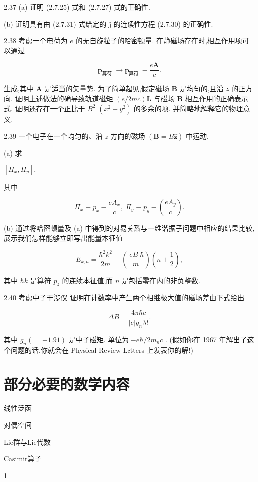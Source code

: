 \documentclass[lang=cn,newtx,10pt,scheme=chinese,thmcnt=section]{elegantbook}
\begin{document}
2.37 (a) 证明 (2.7.25) 式和 (2.7.27) 式的正确性.

(b) 证明具有由 (2.7.31) 式给定的 $\mathbf{j}$ 的连续性方程 (2.7.30) 的正确性.

2.38 考虑一个电荷为 $e$ 的无自旋粒子的哈密顿量. 在静磁场存在时,相互作用项可以通过

$$
{\mathbf{p}}_{\text{算符 }} \rightarrow {\mathbf{p}}_{\text{算符 }} - \frac{e\mathbf{A}}{c}.
$$

生成,其中 $\mathbf{A}$ 是适当的矢量势. 为了简单起见,假定磁场 $\mathbf{B}$ 是均匀的,且沿 $z$ 的正方向. 证明上述做法的确导致轨道磁矩 $\left( {e/{2mc}}\right) \mathbf{L}$ 与磁场 $\mathbf{B}$ 相互作用的正确表示式. 证明还存在一个正比于 ${B}^{2}$ $\left( {{x}^{2} + {y}^{2}}\right)$ 的多余的项. 并简略地解释它的物理意义.

2.39 一个电子在一个均匀的、沿 $z$ 方向的磁场 $\left( {\mathbf{B} = B\widehat{\mathbf{z}}}\right)$ 中运动.

(a) 求

$\left\lbrack {{\Pi }_{x},{\Pi }_{y}}\right\rbrack ,$

其中

$$
{\Pi }_{x} \equiv {p}_{x} - \frac{e{A}_{x}}{c},\;{\Pi }_{y} \equiv {p}_{y} - \left( \frac{e{A}_{y}}{c}\right) .
$$

(b) 通过将哈密顿量及 (a) 中得到的对易关系与一维谐振子问题中相应的结果比较, 展示我们怎样能够立即写出能量本征值

$$
{E}_{k, n} = \frac{{\hbar }^{2}{k}^{2}}{2m} + \left( \frac{\left| {eB}\right| \hbar }{m}\right) \left( {n + \frac{1}{2}}\right) ,
$$

其中 $\hbar k$ 是算符 ${p}_{z}$ 的连续本征值,而 $n$ 是包括零在内的非负整数.

2.40 考虑中子干涉仪
证明在计数率中产生两个相继极大值的磁场差由下式给出

$$
{\Delta B} = \frac{{4\pi }\hbar c}{\left| e\right| {g}_{n}\bar{\lambda }l}.
$$

其中 ${g}_{n}\left( { = - {1.91}}\right)$ 是中子磁矩. 单位为 $- e\hbar /2{m}_{n}c$ . (假如你在 1967 年解出了这个问题的话,你就会在 Physical Review Letters 上发表你的解!)


\chapter{部分必要的数学内容}
\begin{introduction}
	\item 线性泛函
	\item 对偶空间
	\item Lie群与Lie代数
	\item Casimir算子
\end{introduction}
1
\end{document}
